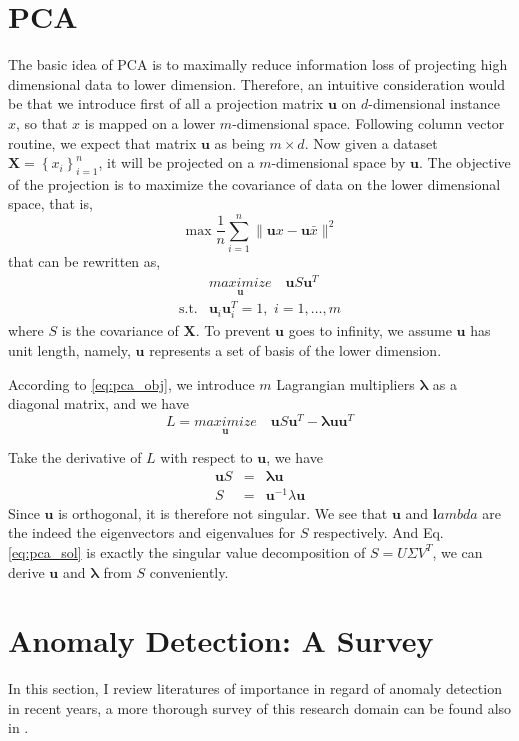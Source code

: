 \documentclass{article}
\newcommand{\vct}[1]{\ensuremath{\boldsymbol{#1}}} %
\begin{document}
\section{PCA}
The basic idea of PCA is to maximally reduce information loss of projecting high dimensional data to lower dimension. Therefore, an intuitive consideration would be that we introduce first of all a projection matrix $\vct u$ on $d$-dimensional instance $x$, so that $x$ is mapped on a lower $m$-dimensional space. Following column vector routine, we expect that matrix $\vct u$ as being $m \times d$. Now given a dataset $ \vct X = \left\{  x_i\right\}_{i=1}^{n}$, it will be projected on a $ m $-dimensional space by $\vct u$. The objective of the projection is to maximize the covariance of data on the lower dimensional space, that is,
\[
	\max \dfrac{1}{n}\sum_{i=1}^{n}\|\vct ux - \vct u\bar{x}\|^2
\]
that can be rewritten as,
\begin{eqnarray}
	& \underset{\vct u}{\textit{maximize}}\quad \vct u S \vct u^T \nonumber \\
	\text{s.t.} & \vct u_i\vct u_i^T = 1, \,\, i=1,\ldots,m
	\label{eq:pca_obj}
\end{eqnarray}
where $S$ is the covariance of $\vct X$. To prevent $\vct u$ goes to infinity, we assume $\vct u$ has unit length, namely, $\vct u$ represents a set of basis of the lower dimension.

According to \eqref{eq:pca_obj}, we introduce $m$ Lagrangian multipliers $\vct \lambda$ as a diagonal matrix, and we have
\[ L = \underset{\vct u}{\textit{maximize}}\quad \vct u S \vct u^T - \vct\lambda \vct u\vct u^T \]

Take the derivative of $L$ with respect to $\vct u$, we have
\begin{eqnarray}
	\vct uS & = & \vct\lambda\vct u \nonumber \\
	S & = & \vct u^{-1}\lambda\vct u
	\label{eq:pca_sol}
\end{eqnarray}
Since $\vct u$ is orthogonal, it is therefore not singular. We see that $\vct u$ and $\vct lambda$ are the indeed the eigenvectors and eigenvalues for $S$ respectively. And Eq.\eqref{eq:pca_sol} is exactly the singular value decomposition of $S=U\Sigma V^T$, we can derive $\vct u$ and $ \vct{\lambda} $ from $S$ conveniently.

\section{Anomaly Detection: A Survey}
In this section, I review literatures of importance in regard of anomaly detection in recent years, a more thorough survey of this research domain can be found also in \cite{Hodge2004, Chandola2009}. 
\end{document}
